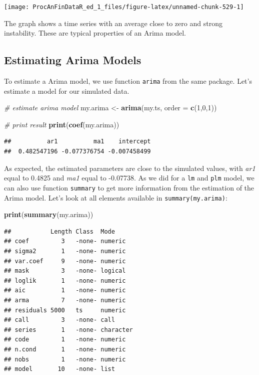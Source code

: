 \documentclass[11pt,]{book}
\newenvironment{Shaded}{\begin{snugshade}}{\end{snugshade}}
\newcommand{\KeywordTok}[1]{\textcolor[rgb]{0.27,0.27,0.27}{\textbf{#1}}}
\newcommand{\DataTypeTok}[1]{\textcolor[rgb]{0.27,0.27,0.27}{#1}}
\newcommand{\DecValTok}[1]{\textcolor[rgb]{0.06,0.06,0.06}{#1}}
\newcommand{\StringTok}[1]{\textcolor[rgb]{0.5,0.5,0.5}{#1}}
\newcommand{\CommentTok}[1]{\textcolor[rgb]{0.56,0.35,0.01}{\textit{#1}}}
\newcommand{\NormalTok}[1]{#1}
\begin{document}
\begin{center}\texttt{[image: ProcAnFinDataR\_ed\_1\_files/figure-latex/unnamed-chunk-529-1]} \end{center}

The graph shows a time series with an average close to zero and strong
instability. These are typical properties of an Arima model.

\subsection{Estimating Arima Models}\label{arima-estimating}

To estimate a Arima model, we use function \texttt{arima} from the same
package. Let's estimate a model for our simulated data.

\begin{Shaded}
\begin{Highlighting}[]
\CommentTok{# estimate arima model}
\NormalTok{my.arima <-}\StringTok{ }\KeywordTok{arima}\NormalTok{(my.ts, }\DataTypeTok{order =} \KeywordTok{c}\NormalTok{(}\DecValTok{1}\NormalTok{,}\DecValTok{0}\NormalTok{,}\DecValTok{1}\NormalTok{))}

\CommentTok{# print result}
\KeywordTok{print}\NormalTok{(}\KeywordTok{coef}\NormalTok{(my.arima))}
\end{Highlighting}
\end{Shaded}

\begin{verbatim}
##          ar1          ma1    intercept 
##  0.482547196 -0.077376754 -0.007458499
\end{verbatim}

As expected, the estimated parameters are close to the simulated values,
with \emph{ar1} equal to 0.4825 and \emph{ma1} equal to -0.07738. As we
did for a \texttt{lm} and \texttt{plm} model, we can also use function
\texttt{summary} to get more information from the estimation of the
Arima model. Let's look at all elements available in
\texttt{summary(my.arima)}: 

\begin{Shaded}
\begin{Highlighting}[]
\KeywordTok{print}\NormalTok{(}\KeywordTok{summary}\NormalTok{(my.arima))}
\end{Highlighting}
\end{Shaded}

\begin{verbatim}
##           Length Class  Mode     
## coef         3   -none- numeric  
## sigma2       1   -none- numeric  
## var.coef     9   -none- numeric  
## mask         3   -none- logical  
## loglik       1   -none- numeric  
## aic          1   -none- numeric  
## arma         7   -none- numeric  
## residuals 5000   ts     numeric  
## call         3   -none- call     
## series       1   -none- character
## code         1   -none- numeric  
## n.cond       1   -none- numeric  
## nobs         1   -none- numeric  
## model       10   -none- list
\end{verbatim}
\end{document}
